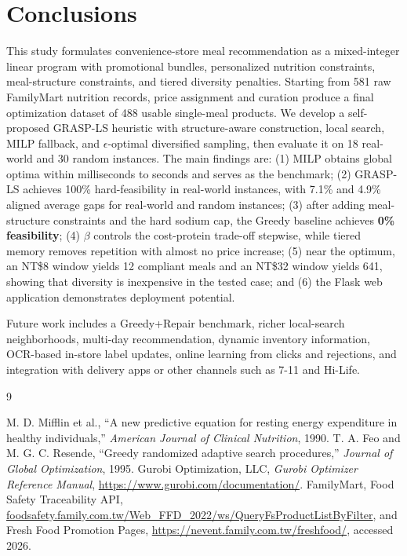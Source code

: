\documentclass[a4paper]{article}
\begin{document}
\section{Conclusions}
This study formulates convenience-store meal recommendation as a mixed-integer linear program with promotional bundles, personalized nutrition constraints, meal-structure constraints, and tiered diversity penalties. Starting from 581 raw FamilyMart nutrition records, price assignment and curation produce a final optimization dataset of 488 usable single-meal products. We develop a self-proposed GRASP-LS heuristic with structure-aware construction, local search, MILP fallback, and $\epsilon$-optimal diversified sampling, then evaluate it on 18 real-world and 30 random instances. The main findings are: (1) MILP obtains global optima within milliseconds to seconds and serves as the benchmark; (2) GRASP-LS achieves 100\% hard-feasibility in real-world instances, with 7.1\% and 4.9\% aligned average gaps for real-world and random instances; (3) after adding meal-structure constraints and the hard sodium cap, the Greedy baseline achieves \textbf{0\% feasibility}; (4) $\beta$ controls the cost-protein trade-off stepwise, while tiered memory removes repetition with almost no price increase; (5) near the optimum, an NT\$8 window yields 12 compliant meals and an NT\$32 window yields 641, showing that diversity is inexpensive in the tested case; and (6) the Flask web application demonstrates deployment potential.

Future work includes a Greedy+Repair benchmark, richer local-search neighborhoods, multi-day recommendation, dynamic inventory information, OCR-based in-store label updates, online learning from clicks and rejections, and integration with delivery apps or other channels such as 7-11 and Hi-Life.

\begin{thebibliography}{9}
\small\raggedright
\setlength{\itemsep}{2pt}
 M. D. Mifflin et al., ``A new predictive equation for resting energy expenditure in healthy individuals,'' \textit{American Journal of Clinical Nutrition}, 1990.
 T. A. Feo and M. G. C. Resende, ``Greedy randomized adaptive search procedures,'' \textit{Journal of Global Optimization}, 1995.
 Gurobi Optimization, LLC, \textit{Gurobi Optimizer Reference Manual}, \url{https://www.gurobi.com/documentation/}.
 FamilyMart, Food Safety Traceability API, \url{foodsafety.family.com.tw/Web_FFD_2022/ws/QueryFsProductListByFilter}, and Fresh Food Promotion Pages, \url{https://nevent.family.com.tw/freshfood/}, accessed 2026.
\end{thebibliography}
\end{document}
